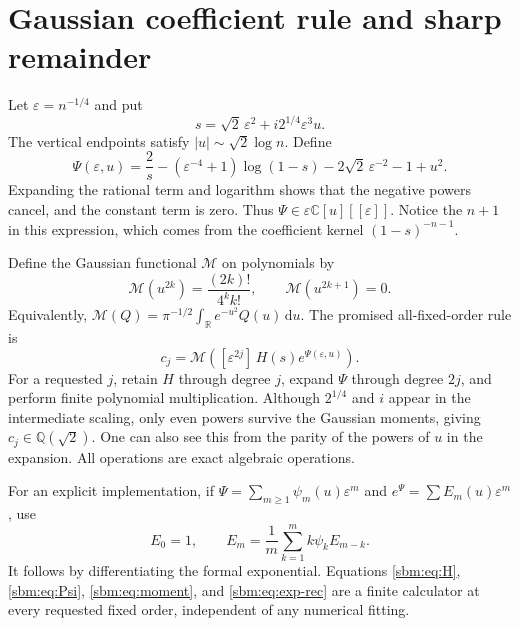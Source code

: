 \documentclass[11pt,letterpaper]{article}
\numberwithin{equation}{section}
\theoremstyle{remark}\newtheorem{remark}[theorem]{Remark}
\newcommand{\dd}{\,\mathrm d}
\newcommand{\CC}{\mathbb C}
\newcommand{\QQ}{\mathbb Q}
\begin{document}
\section{Gaussian coefficient rule and sharp remainder}\label{sbm:sec:gaussian}
Let $\varepsilon=n^{-1/4}$ and put
\begin{equation}\label{sbm:eq:scale}
 s=\sqrt2\,\varepsilon^2+i2^{1/4}\varepsilon^3u.
\end{equation}
The vertical endpoints satisfy $|u|\sim\sqrt2\log n$. Define
\begin{equation}\label{sbm:eq:Psi}
 \Psi(\varepsilon,u)=\frac2s-(\varepsilon^{-4}+1)\log(1-s)
                  -2\sqrt2\,\varepsilon^{-2}-1+u^2.
\end{equation}
Expanding the rational term and logarithm shows that the negative
powers cancel, and the constant term is zero. Thus
$\Psi\in\varepsilon\CC[u][[\varepsilon]]$. Notice the $n+1$ in this
expression, which comes from the coefficient kernel $(1-s)^{-n-1}$.

Define the Gaussian functional $\mathcal M$ on polynomials by
\begin{equation}\label{sbm:eq:moment}
 \mathcal M(u^{2k})=\frac{(2k)!}{4^kk!},\qquad
 \mathcal M(u^{2k+1})=0.
\end{equation}
Equivalently, $\mathcal M(Q)=\pi^{-1/2}\int_{\mathbb R}e^{-u^2}Q(u)\dd u$.
The promised all-fixed-order rule is
\begin{equation}\label{sbm:eq:calculator}
 \boxed{\quad c_j=\mathcal M\left(
 [\varepsilon^{2j}]\,H(s)e^{\Psi(\varepsilon,u)}\right).\quad}
\end{equation}
For a requested $j$, retain $H$ through degree $j$, expand $\Psi$
through degree $2j$, and perform finite polynomial multiplication.
Although $2^{1/4}$ and $i$ appear in the intermediate scaling, only
even powers survive the Gaussian moments, giving $c_j\in\QQ(\sqrt2)$.
One can also see this from the parity of the powers of $u$ in the
expansion. All operations are exact algebraic operations.

For an explicit implementation, if $\Psi=\sum_{m\geq1}\psi_m(u)
\varepsilon^m$ and $e^\Psi=\sum E_m(u)\varepsilon^m$, use
\begin{equation}\label{sbm:eq:exp-rec}
 E_0=1,\qquad E_m=\frac1m\sum_{k=1}^m k\psi_k E_{m-k}.
\end{equation}
It follows by differentiating the formal exponential. Equations
\eqref{sbm:eq:H}, \eqref{sbm:eq:Psi}, \eqref{sbm:eq:moment}, and \eqref{sbm:eq:exp-rec}
are a finite calculator at every requested fixed order, independent
of any numerical fitting.
\end{document}
